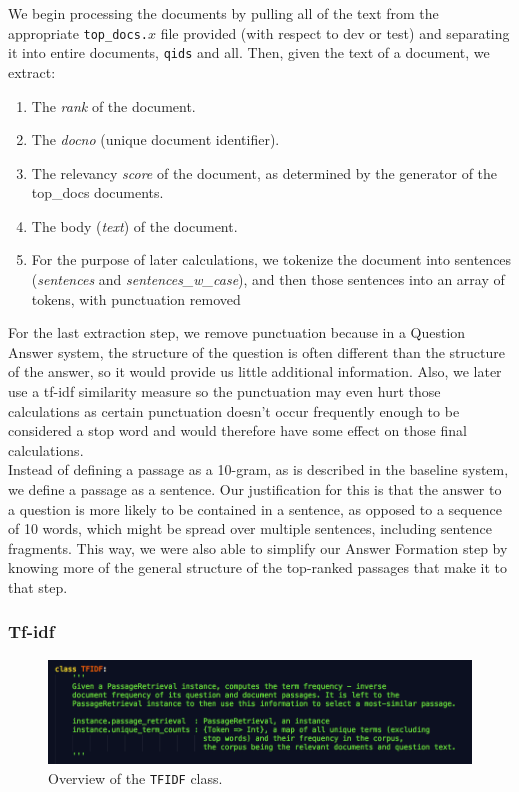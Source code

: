\documentclass{article}
\begin{document}
We begin processing the documents by pulling all of the text from the appropriate \texttt{top\_docs.$x$} file provided (with respect to dev or test) and separating it into entire documents, \texttt{qids} and all. Then, given the text of a document, we extract:
\begin{enumerate}
\item The \textit{rank} of the document.
\item The \textit{docno} (unique document identifier).
\item The relevancy \textit{score} of the document, as determined by the generator of the top\_docs documents.
\item The body (\textit{text}) of the document.
\item For the purpose of later calculations, we tokenize the document into sentences (\textit{sentences} and \textit{sentences\_w\_case}), and then those sentences into an array of tokens, with punctuation removed
\end{enumerate}

For the last extraction step, we remove punctuation because in a Question Answer system, the structure of the question is often different than the structure of the answer, so it would provide us little additional information. Also, we later use a tf-idf similarity measure so the punctuation may even hurt those calculations as certain punctuation doesn't occur frequently enough to be considered a stop word and would therefore have some effect on those final calculations.\\

Instead of defining a passage as a 10-gram, as is described in the baseline system, we define a passage as a sentence. Our justification for this is that the answer to a question is more likely to be contained in a sentence, as opposed to a sequence of 10 words, which might be spread over multiple sentences, including sentence fragments. This way, we were also able to simplify our Answer Formation step by knowing more of the general structure of the top-ranked passages that make it to that step.

\subsubsection{Tf-idf}
\begin{figure}[h]
    \centering
    \includegraphics[width=1.0\textwidth]{images/tfidf.png}
    \caption{Overview of the \texttt{TFIDF} class.}
\end{figure}
\end{document}
